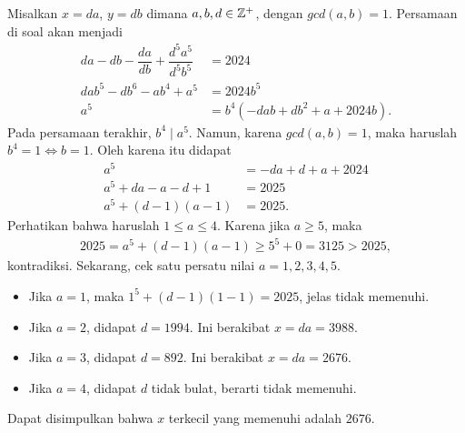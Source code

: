 
\begin{solusi}
    Misalkan $x=da$, $y=db$ dimana $a,b,d \in \mathbb Z^+$, dengan $gcd(a,b)=1$. Persamaan di soal akan menjadi
    \begin{align*}
        da-db-\dfrac{da}{db}+\dfrac{d^5a^5}{d^5b^5} &= 2024\\
        dab^5-db^6-ab^4+a^5 &= 2024b^5\\
        a^5 &= b^4(-dab+db^2+a+2024b).
    \end{align*}
    Pada persamaan terakhir, $b^4 \mid a^5$. Namun, karena $gcd(a,b)=1$, maka haruslah $b^4=1 \iff b=1$. Oleh karena itu didapat
    \begin{align*}
        a^5 &= -da+d+a+2024\\
        a^5 + da - a - d + 1 &= 2025\\
        a^5 + (d-1)(a-1) &= 2025.
    \end{align*}
    Perhatikan bahwa haruslah $1 \le a \le 4$. Karena jika $a\ge 5$, maka
    \begin{align*}
        2025 = a^5 + (d-1)(a-1) \ge 5^5 + 0 = 3125 > 2025,
    \end{align*}
    kontradiksi.
    Sekarang, cek satu persatu nilai $a=1,2,3,4,5$.
    \begin{itemize}
        \item Jika $a=1$, maka $1^5+(d-1)(1-1) = 2025$, jelas tidak memenuhi.
        \item Jika $a=2$, didapat $d=1994$. Ini berakibat $x=da=3988$.
        \item Jika $a=3$, didapat $d=892$. Ini berakibat $x=da=2676$.
        \item Jika $a=4$, didapat $d$ tidak bulat, berarti tidak memenuhi.
    \end{itemize}
    Dapat disimpulkan bahwa $x$ terkecil yang memenuhi adalah $\boxed{2676}$.
\end{solusi}
